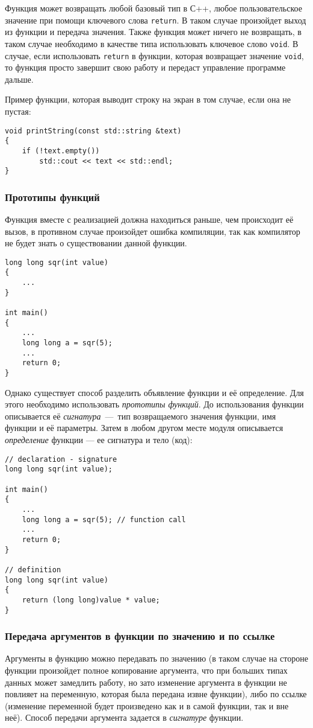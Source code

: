 Функция может возвращать любой базовый тип в С++, любое пользовательское значение при помощи ключевого слова \lstinline|return|. В таком случае произойдет выход из функции и передача значения. Также функция может ничего не возвращать, в таком случае необходимо в качестве типа использовать ключевое слово \lstinline|void|. В случае, если использовать \lstinline|return| в функции, которая возвращает значение \lstinline|void|, то функция просто завершит свою работу и передаст управление программе дальше.

Пример функции, которая выводит строку на экран в том случае, если она не пустая:

\begin{lstlisting}
void printString(const std::string &text)
{
    if (!text.empty())
        std::cout << text << std::endl;
}
\end{lstlisting}

\subsubsection{Прототипы функций}
Функция вместе с реализацией должна находиться раньше, чем происходит её вызов, в противном случае произойдет ошибка компиляции, так как компилятор не будет знать о существовании данной функции.

\begin{lstlisting}
long long sqr(int value)
{
    ...
}

int main()
{
    ...
    long long a = sqr(5);
    ...
    return 0;
}
\end{lstlisting}

Однако существует способ разделить объявление функции и её определение. Для этого необходимо использовать \emph{прототипы функций}. До использования функции описывается её \emph{сигнатура}~---~тип возвращаемого значения функции, имя функции и её параметры.
Затем в любом другом месте модуля описывается \emph{определение} функции --- ее сигнатура и тело (код):

\begin{lstlisting}
// declaration - signature
long long sqr(int value);

int main()
{
    ...
    long long a = sqr(5); // function call
    ...
    return 0;
}

// definition
long long sqr(int value)
{
    return (long long)value * value;
}
\end{lstlisting}

\subsubsection{Передача аргументов в функции по значению и по ссылке}
Аргументы в функцию можно передавать по значению (в таком случае на стороне функции произойдет полное копирование аргумента, что при больших типах данных может замедлить работу, но зато изменение аргумента в функции не повлияет на переменную, которая была передана извне функции), либо по ссылке (изменение переменной будет произведено как и в самой функции, так и вне неё). Способ передачи аргумента задается в \emph{сигнатуре} функции.

